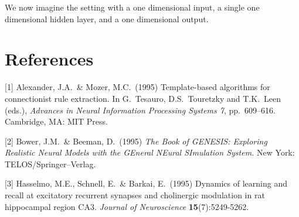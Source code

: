 \documentclass{article}
\begin{document}
We now imagine the setting with a one dimensional input, a single one dimensional hidden layer, and a one dimensional output.


\section*{References}


{
\small


[1] Alexander, J.A.\ \& Mozer, M.C.\ (1995) Template-based algorithms for
connectionist rule extraction. In G.\ Tesauro, D.S.\ Touretzky and T.K.\ Leen
(eds.), {\it Advances in Neural Information Processing Systems 7},
pp.\ 609--616. Cambridge, MA: MIT Press.


[2] Bower, J.M.\ \& Beeman, D.\ (1995) {\it The Book of GENESIS: Exploring
  Realistic Neural Models with the GEneral NEural SImulation System.}  New York:
TELOS/Springer--Verlag.


[3] Hasselmo, M.E., Schnell, E.\ \& Barkai, E.\ (1995) Dynamics of learning and
recall at excitatory recurrent synapses and cholinergic modulation in rat
hippocampal region CA3. {\it Journal of Neuroscience} {\bf 15}(7):5249-5262.
}

\end{document}
